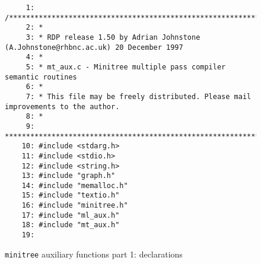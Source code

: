 \begin{figure}
\hspace*{-1cm}
\begin{minipage}{30cm}
\footnotesize
\begin{verbatim}
     1: /*******************************************************************************
     2: *
     3: * RDP release 1.50 by Adrian Johnstone (A.Johnstone@rhbnc.ac.uk) 20 December 1997
     4: *
     5: * mt_aux.c - Minitree multiple pass compiler semantic routines
     6: *
     7: * This file may be freely distributed. Please mail improvements to the author.
     8: *
     9: *******************************************************************************/
    10: #include <stdarg.h>
    11: #include <stdio.h>
    12: #include <string.h>
    13: #include "graph.h"
    14: #include "memalloc.h"
    15: #include "textio.h"
    16: #include "minitree.h"
    17: #include "ml_aux.h"
    18: #include "mt_aux.h"
    19: 
\end{verbatim}
\end{minipage}
\caption{{\tt minitree} auxiliary functions part 1: declarations}
\label{mt_aux.c:1}
\end{figure}
